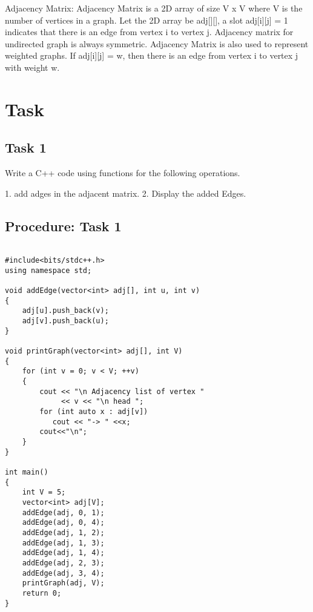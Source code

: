 \documentclass[11pt]{article}            %
\begin{document}
Adjacency Matrix:
Adjacency Matrix is a 2D array of size V x V where V is the number of vertices in a graph. Let the 2D array be adj[][], a slot adj[i][j] = 1 indicates that there is an edge from vertex i to vertex j. Adjacency matrix for undirected graph is always symmetric. Adjacency Matrix is also used to represent weighted graphs. If adj[i][j] = w, then there is an edge from vertex i to vertex j with weight w.

\section{Task}  

\subsection{ Task 1 }     


Write a C++ code using functions for the following operations. 
 
1. 
add adges in the adjacent matrix. 
2. 
Display the added Edges.

 

\subsection{Procedure: Task 1 }    
 

\begin{lstlisting}

#include<bits/stdc++.h>
using namespace std;
 
void addEdge(vector<int> adj[], int u, int v)
{
    adj[u].push_back(v);
    adj[v].push_back(u);
}
 
void printGraph(vector<int> adj[], int V)
{
    for (int v = 0; v < V; ++v)
    {
        cout << "\n Adjacency list of vertex "
             << v << "\n head ";
        for (int auto x : adj[v])
           cout << "-> " <<x;
        cout<<"\n";
    }
}
 
int main()
{
    int V = 5;
    vector<int> adj[V];
    addEdge(adj, 0, 1);
    addEdge(adj, 0, 4);
    addEdge(adj, 1, 2);
    addEdge(adj, 1, 3);
    addEdge(adj, 1, 4);
    addEdge(adj, 2, 3);
    addEdge(adj, 3, 4);
    printGraph(adj, V);
    return 0;
}
\end{lstlisting}





 
\end{document}
